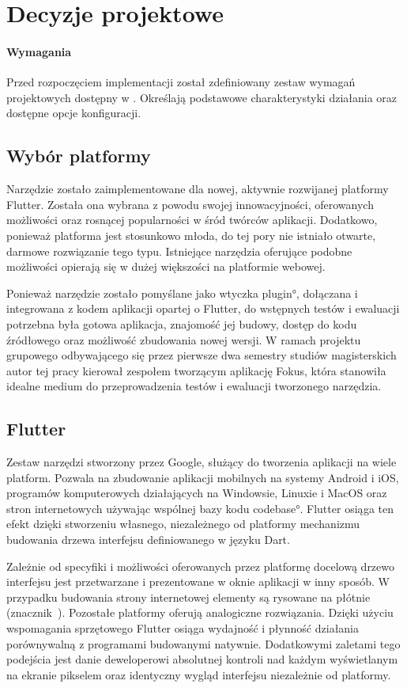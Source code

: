 \section{Decyzje projektowe}

\paragraph{Wymagania} Przed rozpoczęciem implementacji został zdefiniowany zestaw wymagań projektowych dostępny w . Określają podstawowe charakterystyki działania oraz dostępne opcje konfiguracji.

\subsection{Wybór platformy}
Narzędzie zostało zaimplementowane dla nowej, aktywnie rozwijanej platformy Flutter. Została ona wybrana z powodu swojej innowacyjności, oferowanych możliwości oraz rosnącej popularności w śród twórców aplikacji. Dodatkowo, ponieważ platforma jest stosunkowo młoda, do tej pory nie istniało otwarte, darmowe rozwiązanie tego typu. Istniejące narzędzia oferujące podobne możliwości opierają się w dużej większości na platformie webowej.

Ponieważ narzędzie zostało pomyślane jako wtyczka \ang{plugin}, dołączana i integrowana z kodem aplikacji opartej o Flutter, do wstępnych testów i ewaluacji potrzebna była gotowa aplikacja, znajomość jej budowy, dostęp do kodu źródłowego oraz możliwość zbudowania nowej wersji. W ramach projektu grupowego odbywającego się przez pierwsze dwa semestry studiów magisterskich autor tej pracy kierował zespołem tworzącym aplikację Fokus, która stanowiła idealne medium do przeprowadzenia testów i ewaluacji tworzonego narzędzia.

\subsection{Flutter}
Zestaw narzędzi stworzony przez Google, służący do tworzenia aplikacji na wiele platform. Pozwala na zbudowanie aplikacji mobilnych na systemy Android i iOS, programów komputerowych działających na Windowsie, Linuxie i MacOS oraz stron internetowych używając wspólnej bazy kodu \ang{codebase}. Flutter osiąga ten efekt dzięki stworzeniu własnego, niezależnego od platformy mechanizmu budowania drzewa interfejsu definiowanego w języku Dart. 

Zależnie od specyfiki i możliwości oferowanych przez platformę docelową drzewo interfejsu jest przetwarzane i prezentowane w oknie aplikacji w inny sposób. W przypadku budowania strony internetowej elementy są rysowane na płótnie (znacznik~). Pozostałe platformy oferują analogiczne rozwiązania. Dzięki użyciu wspomagania sprzętowego Flutter osiąga wydajność i płynność działania porównywalną z programami budowanymi natywnie. Dodatkowymi zaletami tego podejścia jest danie deweloperowi absolutnej kontroli nad każdym wyświetlanym na ekranie pikselem oraz identyczny wygląd interfejsu niezależnie od platformy.

